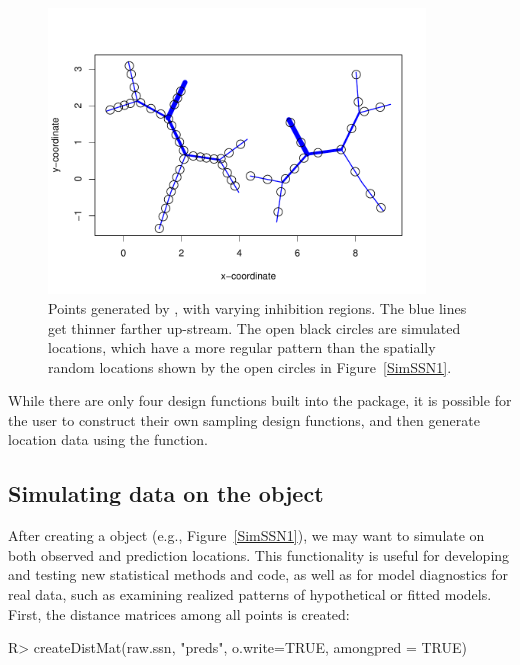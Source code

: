 \documentclass[nojss]{jss}
\renewenvironment{Schunk}{\vspace{\topsep}}{\vspace{\topsep}}
\begin{document}
\begin{figure}[htbp]
  \begin{center}
    \includegraphics[keepaspectratio=true, width = 100mm]{Figures/jss984Fig-SimHardcore}
    \caption{Points generated by , with varying
      inhibition regions. The blue lines get thinner farther up-stream. The open black circles are simulated
      locations, which have a more regular pattern than the spatially random locations shown by the open circles in Figure~\ref{SimSSN1}. \label{SimHardcore}}
  \end{center}
\end{figure}

While there are only four design functions built into the package, it
is possible for the user to construct their own sampling design
functions, and then generate location data using the 
function.



\subsection[Simulating data on the SpatialStreamNetwork object]{Simulating data on the  object}

After creating a  object (e.g.,
Figure~\ref{SimSSN1}), we may want to simulate on both observed and
prediction locations.  This functionality is useful for developing and
testing new statistical methods and code, as well as for model
diagnostics for real data, such as examining realized patterns of
hypothetical or fitted models.  First, the distance matrices among all
points is created:

\begin{Schunk}
\begin{Sinput}
R> createDistMat(raw.ssn, "preds", o.write=TRUE, amongpred = TRUE)
\end{Sinput}
\end{Schunk}
\end{document}
